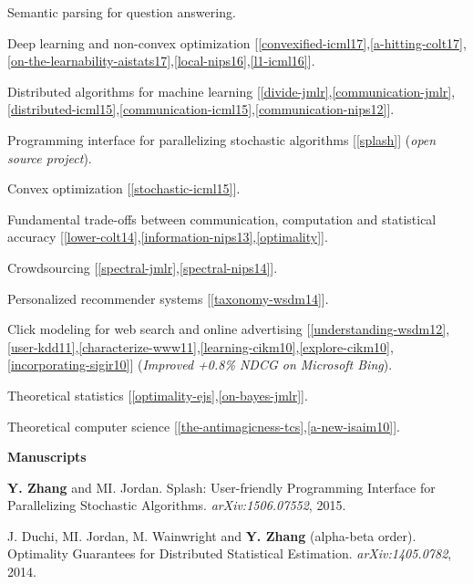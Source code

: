 \documentclass{res} %
\newenvironment{my_item}{
\begin{itemize}
  \setlength{\itemsep}{0pt}
  \setlength{\parskip}{0pt}
  \setlength{\parsep}{0pt}}
{\end{itemize}
}
\begin{document}
\begin{resume}
\vspace{5pt}
\begin{my_item}
\item Semantic parsing for question answering.
\item Deep learning and non-convex optimization [\ref{convexified-icml17},\ref{a-hitting-colt17},\ref{on-the-learnability-aistats17},\ref{local-nips16},\ref{l1-icml16}].
\item Distributed algorithms for machine learning [\ref{divide-jmlr},\ref{communication-jmlr},\ref{distributed-icml15},\ref{communication-icml15},\ref{communication-nips12}].
\item Programming interface for parallelizing stochastic algorithms [\ref{splash}] (\emph{open source project}). 
\item Convex optimization [\ref{stochastic-icml15}].
\item Fundamental trade-offs between communication, computation and statistical accuracy [\ref{lower-colt14},\ref{information-nips13},\ref{optimality}].
\item Crowdsourcing [\ref{spectral-jmlr},\ref{spectral-nips14}].
\item Personalized recommender systems [\ref{taxonomy-wsdm14}].
\item Click modeling for web search and online advertising [\ref{understanding-wsdm12},\ref{user-kdd11},\ref{characterize-www11},\ref{learning-cikm10},\ref{explore-cikm10},\ref{incorporating-sigir10}] (\emph{Improved +0.8\% NDCG on Microsoft Bing}).
\item Theoretical statistics [\ref{optimality-ejs},\ref{on-bayes-jmlr}].
\item Theoretical computer science [\ref{the-antimagicness-tcs},\ref{a-new-isaim10}].
\end{my_item}

{\bf\Large Manuscripts}
\vspace{5pt}

\begin{enumerate}[label={[M\arabic*]}, ref={M\arabic*}]
\item \label{splash}\textbf{Y. Zhang} and MI. Jordan. Splash: User-friendly Programming Interface for Parallelizing Stochastic Algorithms. \emph{arXiv:1506.07552}, 2015.

\item J. Duchi, MI. Jordan, M. Wainwright and \textbf{Y. Zhang} (alpha-beta order). Optimality Guarantees for Distributed Statistical Estimation. \emph{arXiv:1405.0782}, 2014.\label{optimality}
\end{enumerate}


\end{resume}
\end{document}
